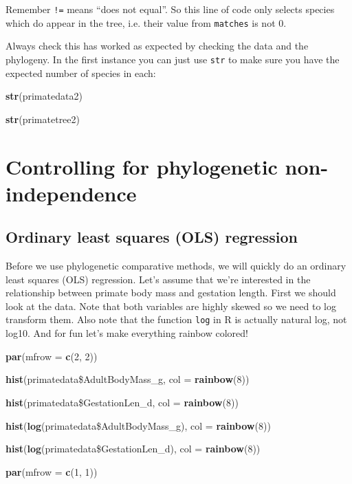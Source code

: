 \documentclass[12pt]{article}
\newcommand{\KeywordTok}[1]{\textcolor[rgb]{0.13,0.29,0.53}{\textbf{{#1}}}}
\newcommand{\DataTypeTok}[1]{\textcolor[rgb]{0.13,0.29,0.53}{{#1}}}
\newcommand{\DecValTok}[1]{\textcolor[rgb]{0.00,0.00,0.81}{{#1}}}
\newcommand{\NormalTok}[1]{{#1}}
\begin{document}
Remember \texttt{!=} means ``does not equal''. So this line of code only selects species which do appear in the tree, i.e. their value from \texttt{matches} is not 0. 

Always check this has worked as expected by checking the data and the phylogeny. In the first instance you can just use \texttt{str} to make sure you have the expected number of species in each:

\begin{snugshade}
\begin{Highlighting}[]
\KeywordTok{str}\NormalTok{(primatedata2)}

\KeywordTok{str}\NormalTok{(primatetree2)}
\end{Highlighting}
\end{snugshade}

\section{Controlling for phylogenetic non-independence}

\subsection{Ordinary least squares (OLS) regression}
Before we use phylogenetic comparative methods, we will quickly do an ordinary least squares (OLS) regression. Let’s assume that we’re interested in the relationship between primate body mass and gestation length. First we should look at the data. Note that both variables are highly skewed so we need to log transform them. Also note that the function \texttt{log} in R is actually natural log, not log10. And for fun let's make everything rainbow colored!

\begin{snugshade}
\begin{Highlighting}[]
\KeywordTok{par}\NormalTok{(}\DataTypeTok{mfrow =} \KeywordTok{c}\NormalTok{(}\DecValTok{2}\NormalTok{, }\DecValTok{2}\NormalTok{))}

\KeywordTok{hist}\NormalTok{(primatedata\$AdultBodyMass_g, }\DataTypeTok{col =} \KeywordTok{rainbow}\NormalTok{(}\DecValTok{8}\NormalTok{))}

\KeywordTok{hist}\NormalTok{(primatedata\$GestationLen_d, }\DataTypeTok{col =} \KeywordTok{rainbow}\NormalTok{(}\DecValTok{8}\NormalTok{))}

\KeywordTok{hist}\NormalTok{(}\KeywordTok{log}\NormalTok{(primatedata\$AdultBodyMass_g), }\DataTypeTok{col =} \KeywordTok{rainbow}\NormalTok{(}\DecValTok{8}\NormalTok{))}

\KeywordTok{hist}\NormalTok{(}\KeywordTok{log}\NormalTok{(primatedata\$GestationLen_d), }\DataTypeTok{col =} \KeywordTok{rainbow}\NormalTok{(}\DecValTok{8}\NormalTok{))}

\KeywordTok{par}\NormalTok{(}\DataTypeTok{mfrow =} \KeywordTok{c}\NormalTok{(}\DecValTok{1}\NormalTok{, }\DecValTok{1}\NormalTok{))}
\end{Highlighting}
\end{snugshade}
\end{document}
